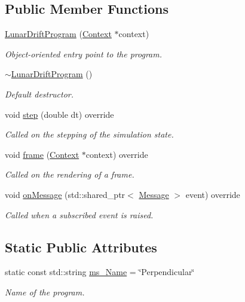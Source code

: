 \subsection*{Public Member Functions}
\begin{DoxyCompactItemize}
\item 
\hyperlink{class_lunar_drift_program_aba4856c849b3972f4d31b1469789a81b}{Lunar\+Drift\+Program} (\hyperlink{class_context}{Context} $\ast$context)
\begin{DoxyCompactList}\small\item\em Object-\/oriented entry point to the program. \end{DoxyCompactList}\item 
\hyperlink{class_lunar_drift_program_a2729a6e9b131ad556a4d8b226c5d3a2e}{$\sim$\+Lunar\+Drift\+Program} ()
\begin{DoxyCompactList}\small\item\em Default destructor. \end{DoxyCompactList}\item 
void \hyperlink{class_lunar_drift_program_a3467aea42888a3eae28d587c90e5b1ff}{step} (double dt) override
\begin{DoxyCompactList}\small\item\em Called on the stepping of the simulation state. \end{DoxyCompactList}\item 
void \hyperlink{class_lunar_drift_program_a5db9835b135348644bc940cd7c2870be}{frame} (\hyperlink{class_context}{Context} $\ast$context) override
\begin{DoxyCompactList}\small\item\em Called on the rendering of a frame. \end{DoxyCompactList}\item 
void \hyperlink{class_lunar_drift_program_a6586725d0267426dae45c7c5772cffc2}{on\+Message} (std\+::shared\+\_\+ptr$<$ \hyperlink{class_message}{Message} $>$ event) override
\begin{DoxyCompactList}\small\item\em Called when a subscribed event is raised. \end{DoxyCompactList}\end{DoxyCompactItemize}
\subsection*{Static Public Attributes}
\begin{DoxyCompactItemize}
\item 
static const std\+::string \hyperlink{class_lunar_drift_program_a2b61915181711d5987e168c74d9beaac}{ms\+\_\+\+Name} = \char`\"{}Perpendicular\char`\"{}
\begin{DoxyCompactList}\small\item\em Name of the program. \end{DoxyCompactList}\end{DoxyCompactItemize}
